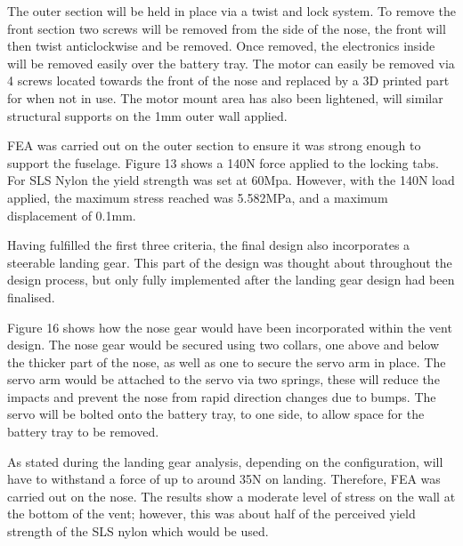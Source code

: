 \documentclass[../../main.tex]{subfiles}
\begin{document}

The outer section will be held in place via a twist and lock system.
To remove the front section two screws will be removed from the side of the nose, the front will then twist anticlockwise and be removed.
Once removed, the electronics inside will be removed easily over the battery tray.
The motor can easily be removed via 4 screws located towards the front of the nose and replaced by a 3D printed part for when not in use.
The motor mount area has also been lightened, will similar structural supports on the 1mm outer wall applied. 


FEA was carried out on the outer section to ensure it was strong enough to support the fuselage.
Figure 13 shows a 140N force applied to the locking tabs.
For SLS Nylon the yield strength was set at 60Mpa.
However, with the 140N load applied, the maximum stress reached was 5.582MPa, and a maximum displacement of 0.1mm. 

Having fulfilled the first three criteria, the final design also incorporates a steerable landing gear.
This part of the design was thought about throughout the design process, but only fully implemented after the landing gear design had been finalised. 


Figure 16 shows how the nose gear would have been incorporated within the vent design.
The nose gear would be secured using two collars, one above and below the thicker part of the nose, as well as one to secure the servo arm in place.
The servo arm would be attached to the servo via two springs, these will reduce the impacts and prevent the nose from rapid direction changes due to bumps.
The servo will be bolted onto the battery tray, to one side, to allow space for the battery tray to be removed. 

As stated during the landing gear analysis, depending on the configuration, will have to withstand a force of up to around 35N on landing.
Therefore, FEA was carried out on the nose.
The results show a moderate level of stress on the wall at the bottom of the vent; however, this was about half of the perceived yield strength of the SLS nylon which would be used. 

\end{document}
